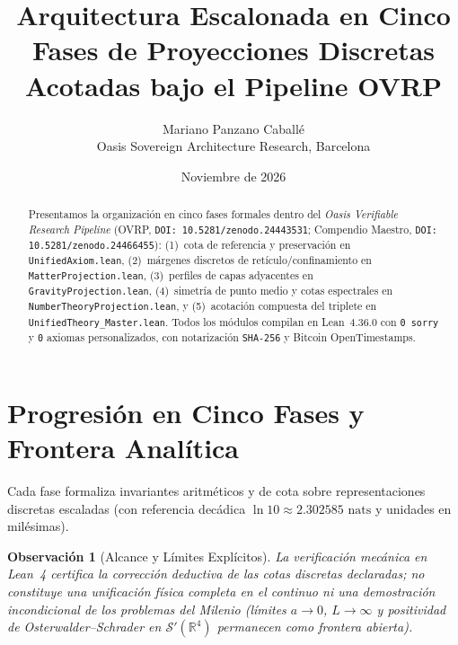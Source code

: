 \documentclass[11pt,a4paper]{article}
\title{Arquitectura Escalonada en Cinco Fases de Proyecciones Discretas Acotadas bajo el Pipeline OVRP}
\author{Mariano Panzano Caball\'e \\ \small Oasis Sovereign Architecture Research, Barcelona}
\date{Noviembre de 2026}
\newtheorem{remark}{Observaci\'on}
\begin{document}
\maketitle

\begin{abstract}
Presentamos la organizaci\'on en cinco fases formales dentro del \emph{Oasis Verifiable Research Pipeline} (OVRP, \texttt{DOI: 10.5281/zenodo.24443531}; Compendio Maestro, \texttt{DOI: 10.5281/zenodo.24466455}): (1)~cota de referencia y preservaci\'on en \texttt{UnifiedAxiom.lean}, (2)~m\'argenes discretos de ret\'iculo/confinamiento en \texttt{MatterProjection.lean}, (3)~perfiles de capas adyacentes en \texttt{GravityProjection.lean}, (4)~simetr\'ia de punto medio y cotas espectrales en \texttt{NumberTheoryProjection.lean}, y (5)~acotaci\'on compuesta del triplete en \texttt{UnifiedTheory\_Master.lean}. Todos los m\'odulos compilan en Lean~4.36.0 con \texttt{0 sorry} y \texttt{0} axiomas personalizados, con notarizaci\'on \texttt{SHA-256} y Bitcoin OpenTimestamps.
\end{abstract}

\section{Progresi\'on en Cinco Fases y Frontera Anal\'itica}
Cada fase formaliza invariantes aritm\'eticos y de cota sobre representaciones discretas escaladas (con referencia dec\'adica $\ln 10 \approx 2.302585\text{ nats}$ y unidades en mil\'esimas).

\begin{remark}[Alcance y L\'imites Expl\'icitos]
La verificaci\'on mec\'anica en Lean~4 certifica la correcci\'on deductiva de las cotas discretas declaradas; no constituye una unificaci\'on f\'isica completa en el continuo ni una demostraci\'on incondicional de los problemas del Milenio (l\'imites $a \to 0$, $L \to \infty$ y positividad de Osterwalder--Schrader en $\mathcal{S}'(\mathbb{R}^4)$ permanecen como frontera abierta).
\end{remark}
\end{document}
